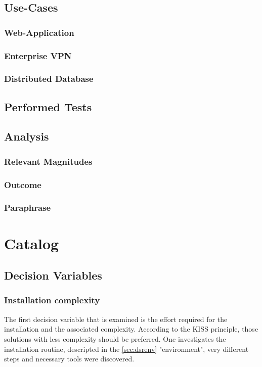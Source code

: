 \documentclass[MSC,Master,english]{twbook}%
\begin{document}
\section{Use-Cases}
\label{sec:dsrusecase}
\subsection{Web-Application}
\subsection{Enterprise VPN}
\subsection{Distributed Database}

\section{Performed Tests}

\section{Analysis}
\label{sec:dsranalysis}
\subsection{Relevant Magnitudes}
\subsection{Outcome}
\subsection{Paraphrase}



\chapter{Catalog}
\label{chap:catalog}

\section{Decision Variables}
\label{sec:variables}
\subsection{Installation complexity}
The first decision variable that is examined is the effort required for the installation and the associated complexity. According to the KISS principle\cite{kiss}, those solutions with less complexity should be preferred. One investigates the installation routine, descripted in the  \autoref{sec:dsrenv} "environment", very different steps and necessary tools were discovered. 
\end{document}
